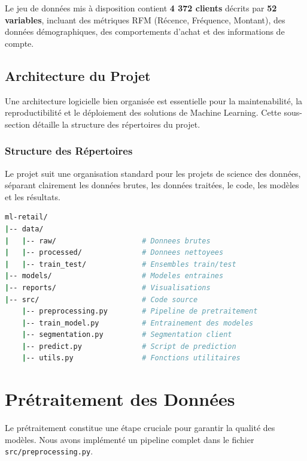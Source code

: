 \documentclass[12pt,a4paper]{article}
\begin{document}
Le jeu de données mis à disposition contient \textbf{4 372 clients} décrits par \textbf{52 variables}, incluant des métriques RFM (Récence, Fréquence, Montant), des données démographiques, des comportements d'achat et des informations de compte.

\subsection{Architecture du Projet}

Une architecture logicielle bien organisée est essentielle pour la maintenabilité, la reproductibilité et le déploiement des solutions de Machine Learning. Cette sous-section détaille la structure des répertoires du projet.

\subsubsection{Structure des Répertoires}

Le projet suit une organisation standard pour les projets de science des données, séparant clairement les données brutes, les données traitées, le code, les modèles et les résultats.

\begin{lstlisting}[language=bash]
ml-retail/
|-- data/
|   |-- raw/                    # Donnees brutes
|   |-- processed/              # Donnees nettoyees
|   |-- train_test/             # Ensembles train/test
|-- models/                     # Modeles entraines
|-- reports/                    # Visualisations
|-- src/                        # Code source
    |-- preprocessing.py        # Pipeline de pretraitement
    |-- train_model.py          # Entrainement des modeles
    |-- segmentation.py         # Segmentation client
    |-- predict.py              # Script de prediction
    |-- utils.py                # Fonctions utilitaires
\end{lstlisting}

\section{Prétraitement des Données}

Le prétraitement constitue une étape cruciale pour garantir la qualité des modèles. Nous avons implémenté un pipeline complet dans le fichier \texttt{src/preprocessing.py}.
\end{document}
